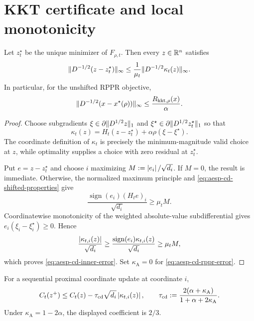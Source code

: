 \section{KKT certificate and local monotonicity}

\begin{lemma}
\label{lem:aesp-cd-kkt-error}
Let $z_t^\star$ be the unique minimizer of $F_{\rho,t}$.  Then every
$z\in\mathbb{R}^n$ satisfies
\begin{equation}
  \lVert D^{-1/2}(z-z_t^\star)\rVert_\infty
  \leq
  \frac{1}{\mu_t}
  \lVert D^{-1/2}\kappa_t(z)\rVert_\infty.
  \label{eq:aesp-cd-inner-error}
\end{equation}
In particular, for the unshifted RPPR objective,
\begin{equation}
  \lVert D^{-1/2}(x-x^\star(\rho))\rVert_\infty
  \leq \frac{R_{\mathrm{kkt},\rho}(x)}{\alpha}.
  \label{eq:aesp-cd-rppr-error}
\end{equation}
\end{lemma}

\begin{proof}
Choose subgradients $\xi\in\partial\lVert D^{1/2}z\rVert_1$ and
$\xi^\star\in\partial\lVert D^{1/2}z_t^\star\rVert_1$ so that
\begin{equation*}
  \kappa_t(z)=H_t(z-z_t^\star)
  +\alpha\rho(\xi-\xi^\star).
\end{equation*}
The coordinate definition of $\kappa_t$ is precisely the minimum-magnitude
valid choice at $z$, while optimality supplies a choice with zero residual at
$z_t^\star$.

Put $e=z-z_t^\star$ and choose $i$ maximizing
$M:=\left\lvert e_i \right\rvert/\sqrt{d_i}$.  If $M=0$, the result is immediate.  Otherwise,
the normalized maximum principle and
\cref{eq:aesp-cd-shifted-properties} give
\begin{equation*}
 \frac{\operatorname{sign}(e_i)(H_te)_i}{\sqrt{d_i}}
 \geq \mu_tM.
\end{equation*}
Coordinatewise monotonicity of the weighted absolute-value subdifferential
gives
$e_i(\xi_i-\xi_i^\star)\geq0$.  Hence
\begin{equation*}
 \frac{\left\lvert \kappa_{t,i}(z) \right\rvert}{\sqrt{d_i}}
 \geq
 \frac{\operatorname{sign}(e_i)\kappa_{t,i}(z)}{\sqrt{d_i}}
 \geq \mu_tM,
\end{equation*}
which proves \cref{eq:aesp-cd-inner-error}.  Set
$\kappa_{\mathrm A}=0$ for \cref{eq:aesp-cd-rppr-error}.
\end{proof}

\begin{theorem}
\label{thm:aesp-cd-mass}
For a sequential proximal coordinate update at coordinate $i$,
\begin{equation}
  C_t(z^+)
  \leq C_t(z)
  -\tau_{\mathrm{cd}}\sqrt{d_i}\left\lvert \kappa_{t,i}(z) \right\rvert,
  \qquad
  \tau_{\mathrm{cd}}
  :=\frac{2(\alpha+\kappa_{\mathrm A})}
          {1+\alpha+2\kappa_{\mathrm A}}.
  \label{eq:aesp-cd-mass-target}
\end{equation}
Under $\kappa_{\mathrm A}=1-2\alpha$, the displayed coefficient is $2/3$.
\end{theorem}


